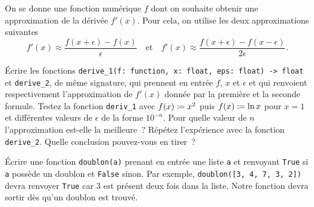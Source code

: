 \documentclass{magnolia}
\begin{document}



On se donne une fonction numérique $f$ dont on souhaite obtenir une approximation de la dérivée $f'(x)$. Pour cela, on utilise les deux approximations suivantes
\[f'(x)\approx\frac{f(x+\epsilon)-f(x)}{\epsilon} \quad\text{et}\quad f'(x)\approx\frac{f(x+\epsilon)-f(x-\epsilon)}{2\epsilon}.\]
\begin{questions}
\question Écrire les fonctions \verb!derive_1(f: function, x: float, eps: float) -> float! et \verb!derive_2!, de
même signature, qui prennent en entrée $f$, $x$ et $\epsilon$ et qui renvoient respectivement l'approximation de $f'(x)$ donnée par la première et la seconde formule.
\question Testez la fonction \verb!deriv_1! avec $f(x)\coloneqq x^2$ puis $f(x)\coloneqq \ln x$ pour $x=1$ et différentes valeurs de
  $\epsilon$ de la forme $10^{-n}$. Pour quelle valeur de $n$ l'approximation est-elle la meilleure~?
\question Répétez l'expérience avec la fonction \verb!derive_2!. Quelle conclusion pouvez-vous en tirer~?
\end{questions}


Écrire une fonction \verb!doublon(a)! prenant en entrée une liste \verb!a! et renvoyant \verb_True_
si \verb_a_ possède un doublon et \verb_False_ sinon. Par exemple, \verb_doublon([3, 4, 7, 3, 2])_
devra renvoyer \verb_True_ car 3 est présent deux fois dans la liste. Notre fonction devra
sortir dès qu'un doublon est trouvé.
\end{document}
